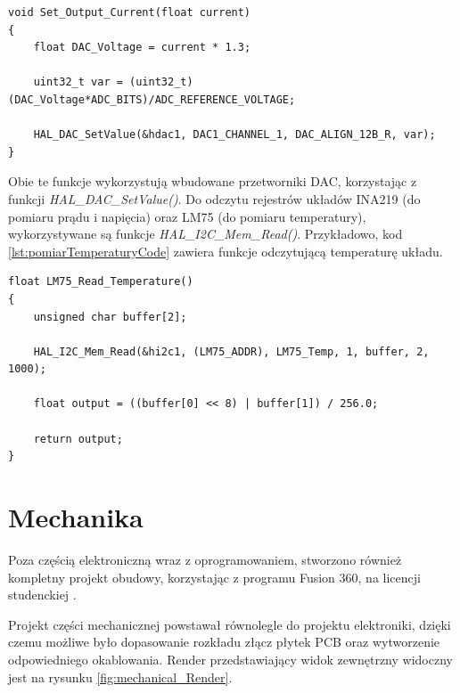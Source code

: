 \begin{lstlisting}[label=lst:currentSetCode,caption=Funkcja odpowiadająca za ustawienie prądu wyjściowego., float,frame=tb]
void Set_Output_Current(float current)
{
	float DAC_Voltage = current * 1.3;

	uint32_t var = (uint32_t)(DAC_Voltage*ADC_BITS)/ADC_REFERENCE_VOLTAGE;

	HAL_DAC_SetValue(&hdac1, DAC1_CHANNEL_1, DAC_ALIGN_12B_R, var);
}
\end{lstlisting}

Obie te funkcje wykorzystują wbudowane przetworniki DAC, korzystając z funkcji \textit{HAL\_DAC\_SetValue()}.
Do odczytu rejestrów układów INA219 (do pomiaru prądu i napięcia) oraz LM75 (do pomiaru temperatury), wykorzystywane są funkcje
\textit{HAL\_I2C\_Mem\_Read()}. Przykładowo, kod \ref{lst:pomiarTemperaturyCode} zawiera funkcje odczytującą temperaturę układu.

\begin{lstlisting}[label=lst:pomiarTemperaturyCode,caption=Funkcja odczytująca temperaturę z układu LM75., float,frame=tb]
float LM75_Read_Temperature()
{
    unsigned char buffer[2];

    HAL_I2C_Mem_Read(&hi2c1, (LM75_ADDR), LM75_Temp, 1, buffer, 2, 1000);

    float output = ((buffer[0] << 8) | buffer[1]) / 256.0;

    return output;
}
\end{lstlisting}





\FloatBarrier
\section{Mechanika}
\label{section:mechanical}


Poza częścią elektroniczną wraz z oprogramowaniem, stworzono również kompletny projekt obudowy, korzystając z 
programu Fusion 360, na licencji studenckiej \cite{fusion360}. 

Projekt części mechanicznej powstawał równolegle do projektu elektroniki, dzięki czemu możliwe było dopasowanie
rozkładu złącz płytek PCB oraz wytworzenie odpowiedniego okablowania. Render przedstawiający widok zewnętrzny 
widoczny jest na rysunku \ref{fig:mechanical_Render}.

